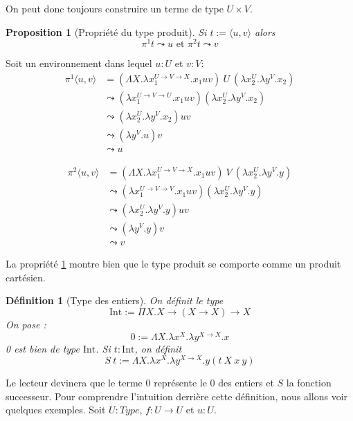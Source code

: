 \documentclass[a4paper,12pt]{article}
\theoremstyle{plain}
\newtheorem{prop}[theo]{Proposition}
\newtheorem{defi}[theo]{Définition}
\newenvironment{demo}[1][]
 {\if\relax\detokenize{#1}\relax
    \renewcommand\theproofinner{\thetheo}%
  \else
    \renewcommand{\theproofinner}{#1}%
  \fi
  \proofinner}
 {\endproofinner}
\begin{document}
On peut donc toujours construire un terme de type $U \times V$.

\begin{prop}[Propriété du type produit]
\label{prop produit}
Si $t := \langle u, v \rangle$ alors $$\pi^1 t \leadsto u  \text{ et } \pi^2 t \leadsto v$$
\end{prop}

\begin{demo} Soit un environnement dans lequel $u: U$
et $v:V$: \begin{align*}
\pi^1 \langle u, v \rangle &= (\Lambda X. \lambda x_1^{U \to V \to X}.x_1 uv) \ U \ (\lambda x_2^U. \lambda y^V . x_2)\\
&\leadsto (\lambda x_1^{U \to V \to U}.x_1 uv) (\lambda x_2^U. \lambda y^V . x_2)\\
&\leadsto (\lambda x_2^U. \lambda y^V . x_2) uv\\
& \leadsto (\lambda y^V . u) v\\
& \leadsto u
\end{align*}

\begin{align*}
\pi^2 \langle u, v \rangle &= (\Lambda X. \lambda x_1^{U \to V \to X}.x_1 uv) \ V \ (\lambda x_2^U. \lambda y^V . y)\\
&\leadsto (\lambda x_1^{U \to V \to V}.x_1 uv) (\lambda x_2^U. \lambda y^V . y)\\
&\leadsto (\lambda x_2^U. \lambda y^V . y) uv\\
& \leadsto (\lambda y^V . y) v\\
& \leadsto v
\end{align*} \end{demo}

La propriété \ref{prop produit} montre bien que le type produit se comporte comme un produit cartésien.

\begin{defi}[Type des entiers]
On définit le type
$$\mathrm{Int} := \Pi X. X \to (X \to X) \to X$$
On pose :
$$ 0 := \Lambda X. \lambda x^X. \lambda y^{X \to X}. x$$
0 est bien de type $\mathrm{Int}$. Si $t : \mathrm{Int}$, on définit
$$ S \ t := \Lambda X. \lambda x^X. \lambda y^{X \to X}. y ( t\  X \ x \ y)$$
\end{defi}

Le lecteur devinera que le terme 0 représente le 0 des entiers et $S$ la fonction successeur. Pour comprendre l'intuition derrière cette définition, nous allons voir quelques exemples. Soit $U : \mathit{Type}$, $f: U \to U$ et $u : U$.
\end{document}
